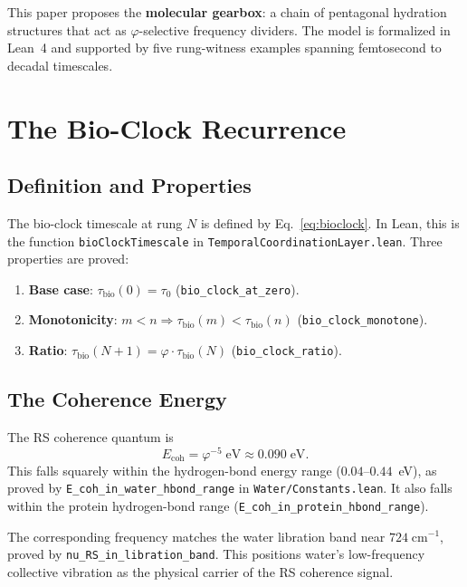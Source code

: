 \documentclass[11pt,twocolumn]{article}
\begin{document}
This paper proposes the \textbf{molecular gearbox}: a chain of pentagonal
hydration structures that act as $\varphi$-selective frequency dividers.
The model is formalized in Lean~4 and supported by five rung-witness
examples spanning femtosecond to decadal timescales.

\section{The Bio-Clock Recurrence}

\subsection{Definition and Properties}

The bio-clock timescale at rung $N$ is defined by
Eq.~\eqref{eq:bioclock}. In Lean, this is the function
\texttt{bioClockTimescale} in \texttt{TemporalCoordinationLayer.lean}.
Three properties are proved:

\begin{enumerate}
\item \textbf{Base case}: $\tau_{\mathrm{bio}}(0) = \tau_0$
  (\texttt{bio\_clock\_at\_zero}).
\item \textbf{Monotonicity}: $m < n \Rightarrow
  \tau_{\mathrm{bio}}(m) < \tau_{\mathrm{bio}}(n)$
  (\texttt{bio\_clock\_monotone}).
\item \textbf{Ratio}: $\tau_{\mathrm{bio}}(N+1) =
  \varphi \cdot \tau_{\mathrm{bio}}(N)$
  (\texttt{bio\_clock\_ratio}).
\end{enumerate}

\subsection{The Coherence Energy}

The RS coherence quantum is
\begin{equation}\label{eq:ecoh}
  E_{\mathrm{coh}} = \varphi^{-5} \;\text{eV} \approx 0.090\;\text{eV}.
\end{equation}
This falls squarely within the hydrogen-bond energy range
($0.04$--$0.44$~eV), as proved by \texttt{E\_coh\_in\_water\_hbond\_range}
in \texttt{Water/Constants.lean}. It also falls within the protein
hydrogen-bond range (\texttt{E\_coh\_in\_protein\_hbond\_range}).

The corresponding frequency matches the water libration band near
$724\;\mathrm{cm}^{-1}$, proved by \texttt{nu\_RS\_in\_libration\_band}.
This positions water's low-frequency collective vibration as the physical
carrier of the RS coherence signal.
\end{document}
